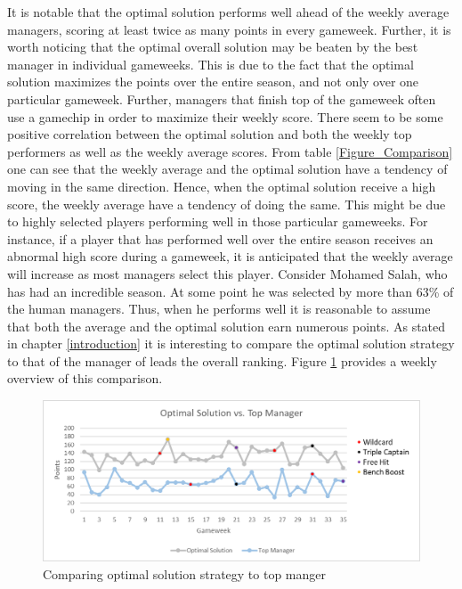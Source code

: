  It is notable that the optimal solution performs well ahead of the weekly average managers, scoring at least twice as many points in every gameweek. Further, it is worth noticing that the optimal overall solution may be beaten by the best manager in individual gameweeks. This is due to the fact that the optimal solution maximizes the points over the entire season, and not only over one particular gameweek. Further, managers that finish top of the gameweek often use a gamechip in order to maximize their weekly score. 
\newpar
There seem to be some positive correlation between the optimal solution and both the weekly top performers as well as the weekly average scores. From table \ref{Figure_Comparison} one can see that the weekly average and the optimal solution have a tendency of moving in the same direction. Hence, when the optimal solution receive a high score, the weekly average have a tendency of doing the same. This might be due to highly selected players performing well in those particular gameweeks. For instance, if a player that has performed well over the entire season receives an abnormal high score during a gameweek, it is anticipated that the weekly average will increase as most managers select this player. Consider Mohamed Salah, who has had an incredible season. At some point he was selected by more than 63\% of the human managers. Thus, when he performs well it is reasonable to assume that both the average and the optimal solution earn numerous points. 
\newpar
As stated in chapter \ref{introduction} it is interesting to compare the optimal solution strategy to that of the manager of leads the overall ranking. Figure \ref{Top_Manager} provides a weekly overview of this comparison.

\begin{figure}[H]
\label{fig:Top_Manager}
    \centering
    \includegraphics[scale=0.75]{fig/chapter_7/Optimal_vs_Top_colour.png}
    \caption{Comparing optimal solution strategy to top manger}
\label{Top_Manager}    
\end{figure}

